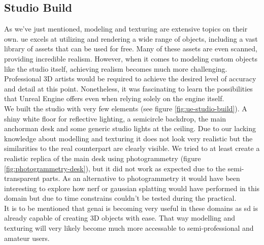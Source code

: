 \documentclass[
  a4paper,  %
  twoside,  %
  bibliography=totoc,
  headsepline,
  cleardoublepage=empty,
  parskip=half,
  draft=false
]{scrbook}
\begin{document}
\subsection*{Studio Build}
As we've just mentioned, modeling and texturing are extensive topics on their own. \gls{ue} excels at utilizing and rendering a wide range of objects, including a vast library of assets that can be used for free. Many of these assets are even scanned, providing incredible realism. However, when it comes to modeling custom objects like the studio itself, achieving realism becomes much more challenging. Professional 3D artists would be required to achieve the desired level of accuracy and detail at this point. Nonetheless, it was fascinating to learn the possibilities that Unreal Engine offers even when relying solely on the engine itself. \\
We built the studio with very few elements (see figure \ref{fig:ue-studio-build}). A shiny white floor for reflective lighting, a semicircle backdrop, the main anchorman desk and some generic studio lights at the ceiling. Due to our lacking knowledge about modelling and texturing it does not look very realistic but the similarities to the real counterpart are clearly visible. We tried to at least create a realistic replica of the main desk using photogrammetry (figure \ref{fig:photogrammetry-desk}), but it did not work as expected due to the semi-transparent parts. As an alternative to photogrammetry it would have been interesting to explore how \gls{nerf} or gaussian splatting would have performed in this domain but due to time constrains couldn't be tested during the practical. \\ 
It is to be mentioned that \gls{genai} is becoming very useful in these domains as \gls{sd} is already capable of creating 3D objects with ease. That way modelling and texturing will very likely become much more accessable to semi-professional and amateur users.
\end{document}

